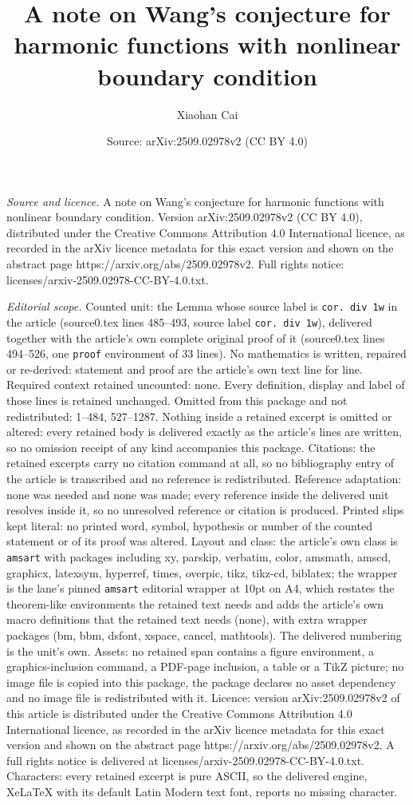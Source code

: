 \documentclass[10pt,a4paper]{amsart}
\title[A note on Wang's conjecture for harmonic functions with nonl]{A note on Wang's conjecture for harmonic functions with nonlinear boundary condition}
\author{Xiaohan Cai}
\date{Source: arXiv:2509.02978v2 (CC BY 4.0)}
\begin{document}
\maketitle

\noindent\emph{Source and licence.} A note on Wang's conjecture for harmonic functions with nonlinear boundary condition. Version arXiv:2509.02978v2 (CC BY 4.0), distributed under the Creative Commons Attribution 4.0 International licence, as recorded in the arXiv licence metadata for this exact version and shown on the abstract page https://arxiv.org/abs/2509.02978v2. Full rights notice: licenses/arxiv-2509.02978-CC-BY-4.0.txt.\par\smallskip

\noindent\textit{Editorial scope.} Counted unit: the Lemma whose source label is \texttt{cor. div 1w} in the article (source0.tex lines 485--493, source label \texttt{cor. div 1w}), delivered together with the article's own complete original proof of it (source0.tex lines 494--526, one \texttt{proof} environment of 33 lines). No mathematics is written, repaired or re-derived: statement and proof are the article's own text line for line. Required context retained uncounted: none. Every definition, display and label of those lines is retained unchanged. Omitted from this package and not redistributed: 1--484, 527--1287. Nothing inside a retained excerpt is omitted or altered: every retained body is delivered exactly as the article's lines are written, so no omission receipt of any kind accompanies this package. Citations: the retained excerpts carry no citation command at all, so no bibliography entry of the article is transcribed and no reference is redistributed. Reference adaptation: none was needed and none was made; every reference inside the delivered unit resolves inside it, so no unresolved reference or citation is produced. Printed slips kept literal: no printed word, symbol, hypothesis or number of the counted statement or of its proof was altered. Layout and class: the article's own class is \texttt{amsart} with packages including xy, parskip, verbatim, color, amsmath, amscd, graphicx, latexsym, hyperref, times, overpic, tikz, tikz-cd, biblatex; the wrapper is the lane's pinned \texttt{amsart} editorial wrapper at 10pt on A4, which restates the theorem-like environments the retained text needs and adds the article's own macro definitions that the retained text needs (none), with extra wrapper packages (bm, bbm, dsfont, xspace, cancel, mathtools). The delivered numbering is the unit's own. Assets: no retained span contains a figure environment, a graphics-inclusion command, a PDF-page inclusion, a table or a TikZ picture; no image file is copied into this package, the package declares no asset dependency and no image file is redistributed with it. Licence: version arXiv:2509.02978v2 of this article is distributed under the Creative Commons Attribution 4.0 International licence, as recorded in the arXiv licence metadata for this exact version and shown on the abstract page https://arxiv.org/abs/2509.02978v2. A full rights notice is delivered at licenses/arxiv-2509.02978-CC-BY-4.0.txt. Characters: every retained excerpt is pure ASCII, so the delivered engine, XeLaTeX with its default Latin Modern text font, reports no missing character.
\end{document}
